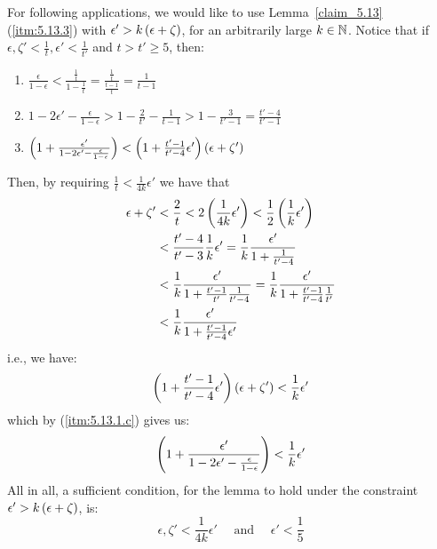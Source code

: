     \begin{remark}[Remark 5.13.1]\label{remark_5.13.1}
        For following applications, we would like to use Lemma~\ref{claim_5.13} (\ref{itm:5.13.3}) with
        $\epsilon' > k \left( \epsilon + \zeta \right)$, for an arbitrarily large $k \in \mathbb{N}$.
        Notice that if $\epsilon, \zeta' < \frac{1}{t}, \epsilon' < \frac{1}{t'}$ and $t > t' \geq 5$, then:
        \begin{enumerate}[label=(\alph*), ref=\alph*]
            \item $\frac{\epsilon}{1-\epsilon} < \frac{\frac{1}{t}}{1-\frac{1}{t}} = \frac{\frac{1}{t}}{\frac{t-1}{t}}
                = \frac{1}{t-1}$
            \item $1 - 2 \epsilon' - \frac{\epsilon}{1-\epsilon} > 1 - \frac{2}{t'} - \frac{1}{t-1} > 1 - \frac{3}{t'-1}
                = \frac{t'-4}{t'-1}$
            \item\label{itm:5.13.1.c} $\left( 1 + \frac{\epsilon'}{1 - 2 \epsilon' - \frac{\epsilon}{1-\epsilon}} \right) <
                \left( 1 + \frac{t'-1}{t'-4} \epsilon' \right) \left( \epsilon + \zeta' \right)$
        \end{enumerate}
        Then, by requiring $\frac{1}{t} < \frac{1}{4k}\epsilon'$ we have that
        \begin{align*}
            \epsilon + \zeta'
                & < \frac{2}{t} < 2 \left( \frac{1}{4k}\epsilon' \right) < \frac{1}{2} \left( \frac{1}{k}\epsilon' \right) \\
                & < \frac{t'-4}{t'- 3} \frac{1}{k} \epsilon' = \frac{1}{k} \frac{\epsilon'}{1 + \frac{1}{t'-4}} \\
                & < \frac{1}{k} \frac{\epsilon'}{1 + \frac{t'-1}{t'}\frac{1}{t'-4}} = \frac{1}{k} \frac{\epsilon'}{1 + \frac{t'-1}{t'-4}\frac{1}{t'}} \\
                & < \frac{1}{k} \frac{\epsilon'}{1 + \frac{t'-1}{t'-4}\epsilon'}
        \end{align*}
        i.e., we have:
        $$
            \left( 1 + \frac{t'-1}{t'-4} \epsilon' \right) \left( \epsilon + \zeta' \right) < \frac{1}{k} \epsilon'
        $$
        which by (\ref{itm:5.13.1.c}) gives us:
        $$
            \left( 1 + \frac{\epsilon'}{1 - 2 \epsilon' - \frac{\epsilon}{1-\epsilon}} \right) < \frac{1}{k} \epsilon'
        $$
        All in all, a sufficient condition, for the lemma to hold under the constraint $\epsilon' > k \left( \epsilon + \zeta \right)$, is:
        $$
            \epsilon, \zeta' < \frac{1}{4k} \epsilon' \quad \text{ and } \quad \epsilon' < \frac{1}{5}
        $$
    \end{remark}

